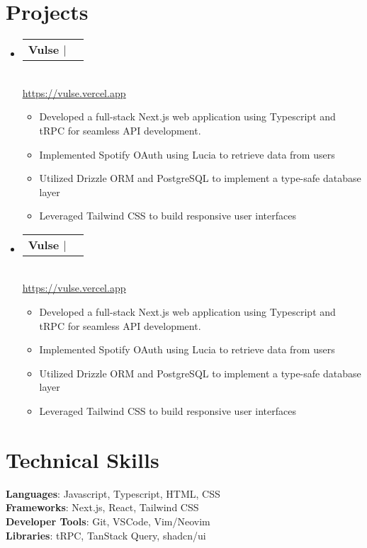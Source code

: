 \documentclass[letterpaper,11pt]{article}
\makeatletter
\newcommand{\resumeItem}[1]{
  \item\small{
    {#1 \vspace{-2pt}}
  }
}
\newcommand{\resumeProjectHeading}[2]{
    \item
    \begin{tabular*}{0.97\textwidth}{l@{\extracolsep{\fill}}r}
      \textbf{\normalsize #1} & #2 \\
    \end{tabular*}\vspace{-7pt}
}
\newcommand{\resumeSubHeadingListStart}{\begin{itemize}[leftmargin=0.15in, label={}]}
\newcommand{\resumeSubHeadingListEnd}{\end{itemize}}
\newcommand{\resumeItemListStart}{\begin{itemize}}
\newcommand{\resumeItemListEnd}{\end{itemize}\vspace{-5pt}}
\makeatother
\begin{document}


\section{Projects}
\resumeSubHeadingListStart
\resumeProjectHeading
{\textbf{Vulse} $|$ \small\normalfont{\emph{Next.js, Typescript, tRPC, Lucia, Drizzle ORM, PostgreSQL, Tailwind CSS}}}
{} \\ [0.6em]
\href{https://vulse.vercel.app}{\small\normalfont\ul {https://vulse.vercel.app}}
\resumeItemListStart
\resumeItem{Developed a full-stack Next.js web application using Typescript and tRPC for seamless API development.}
\resumeItem{Implemented Spotify OAuth using Lucia to retrieve data from users}
\resumeItem{Utilized Drizzle ORM and PostgreSQL to implement a type-safe database layer}
\resumeItem{Leveraged Tailwind CSS to build responsive user interfaces}
\resumeItemListEnd
\resumeProjectHeading
{\textbf{Vulse} $|$ \small\normalfont{\emph{Next.js, Typescript, tRPC, Lucia, Drizzle ORM, PostgreSQL, Tailwind CSS}}}
{} \\ [0.6em]
\href{https://vulse.vercel.app}{\small\normalfont\ul {https://vulse.vercel.app}}
\resumeItemListStart
\resumeItem{Developed a full-stack Next.js web application using Typescript and tRPC for seamless API development.}
\resumeItem{Implemented Spotify OAuth using Lucia to retrieve data from users}
\resumeItem{Utilized Drizzle ORM and PostgreSQL to implement a type-safe database layer}
\resumeItem{Leveraged Tailwind CSS to build responsive user interfaces}
\resumeItemListEnd
\resumeSubHeadingListEnd

\section{Technical Skills}
\begin{itemize}[leftmargin=0.15in, label={}]
  \small{\item{
        \textbf{Languages}{: Javascript, Typescript, HTML, CSS} \\
        \textbf{Frameworks}{: Next.js, React, Tailwind CSS} \\
        \textbf{Developer Tools}{: Git, VSCode, Vim/Neovim} \\
        \textbf{Libraries}{: tRPC, TanStack Query, shadcn/ui }
        }}
\end{itemize}

\end{document}

